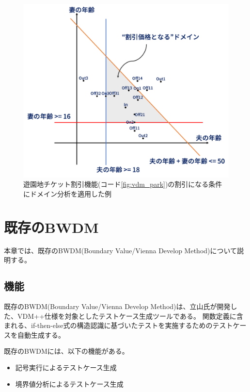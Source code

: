 \documentclass[uplatex, report, a4j, 10pt]{jsbook}
\newcommand{\tool}{BWDM}
\begin{document}
\begin{figure}[tp]
  \centering
  \includegraphics[keepaspectratio, width=160mm]{figs/domain_points}
  \caption{遊園地チケット割引機能(コード\ref{fig:vdm_park})の割引になる条件にドメイン分析を適用した例}
  \label{fig:domain_points}
\end{figure}



\chapter{既存の\tool{}}\label{cha:Exist}
本章では、既存のBWDM(Boundary Value/Vienna Develop Method)について説明する。

\section{機能}
既存のBWDM(Boundary Value/Vienna Develop Method)は、立山氏が開発した、VDM++仕様を対象としたテストケース生成ツールである。
関数定義に含まれる、if-then-else式の構造認識に基づいたテストを実施するためのテストケースを自動生成する\cite{tachiyama6}。


既存のBWDMには、以下の機能がある。

\begin{itemize}
  \item 記号実行によるテストケース生成
  \item 境界値分析によるテストケース生成
\end{itemize}
\end{document}
